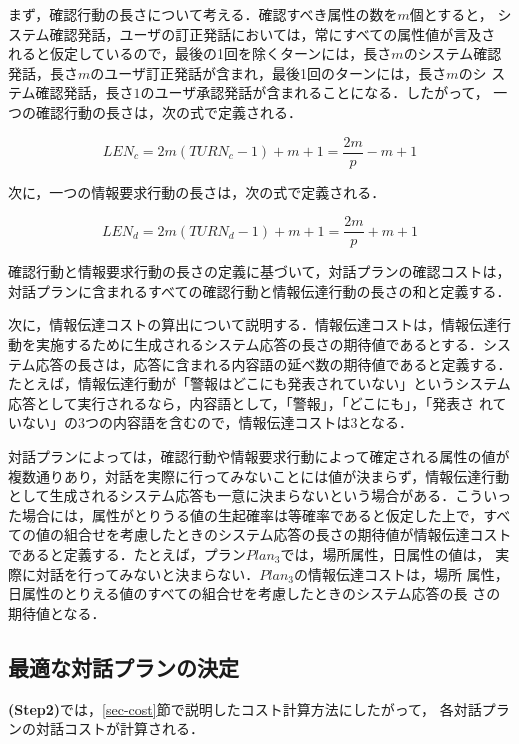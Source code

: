 まず，確認行動の長さについて考える．確認すべき属性の数を$m$個とすると，
システム確認発話，ユーザの訂正発話においては，常にすべての属性値が言及さ
れると仮定しているので，最後の1回を除くターンには，長さ$m$のシステム確認
発話，長さ$m$のユーザ訂正発話が含まれ，最後1回のターンには，長さ$m$のシ
ステム確認発話，長さ$1$のユーザ承認発話が含まれることになる．したがって，
一つの確認行動の長さは，次の式で定義される．

\begin{equation}
LEN_{c} = 2m(TURN_{c}-1) + m + 1 = \frac{2m}{p} - m + 1
\end{equation}

次に，一つの情報要求行動の長さは，次の式で定義される．

\begin{equation}
LEN_{d} =2m(TURN_{d}-1) + m + 1 = \frac{2m}{p} + m + 1
\end{equation}

確認行動と情報要求行動の長さの定義に基づいて，対話プランの確認コストは，
対話プランに含まれるすべての確認行動と情報伝達行動の長さの和と定義する．

次に，情報伝達コストの算出について説明する．情報伝達コストは，情報伝達行
動を実施するために生成されるシステム応答の長さの期待値であるとする．シス
テム応答の長さは，応答に含まれる内容語の延べ数の期待値であると定義する．
たとえば，情報伝達行動が「警報はどこにも発表されていない」というシステム
応答として実行されるなら，内容語として，「警報」，「どこにも」，「発表さ
れていない」の3つの内容語を含むので，情報伝達コストは3となる．

対話プランによっては，確認行動や情報要求行動によって確定される属性の値が
複数通りあり，対話を実際に行ってみないことには値が決まらず，情報伝達行動
として生成されるシステム応答も一意に決まらないという場合がある．こういっ
た場合には，属性がとりうる値の生起確率は等確率であると仮定した上で，すべ
ての値の組合せを考慮したときのシステム応答の長さの期待値が情報伝達コスト
であると定義する．たとえば，プラン$Plan_{3}$では，場所属性，日属性の値は，
実際に対話を行ってみないと決まらない．$Plan_{3}$の情報伝達コストは，場所
属性，日属性のとりえる値のすべての組合せを考慮したときのシステム応答の長
さの期待値となる．


\subsection{最適な対話プランの決定}

{\bf (Step2)}では，\ref{sec-cost}節で説明したコスト計算方法にしたがって，
各対話プランの対話コストが計算される．

